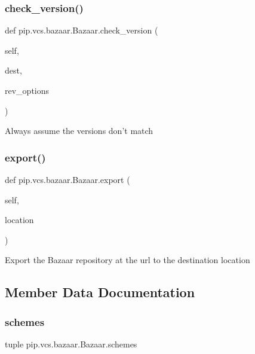 \subsubsection{\texorpdfstring{check\+\_\+version()}{check\_version()}}
{\footnotesize\ttfamily def pip.\+vcs.\+bazaar.\+Bazaar.\+check\+\_\+version (\begin{DoxyParamCaption}\item[{}]{self,  }\item[{}]{dest,  }\item[{}]{rev\+\_\+options }\end{DoxyParamCaption})}

\begin{DoxyVerb}Always assume the versions don't match\end{DoxyVerb}
 \mbox{\label{classpip_1_1vcs_1_1bazaar_1_1_bazaar_ada58f106fcf29da984e45a3e4e4d9057}} 
\subsubsection{\texorpdfstring{export()}{export()}}
{\footnotesize\ttfamily def pip.\+vcs.\+bazaar.\+Bazaar.\+export (\begin{DoxyParamCaption}\item[{}]{self,  }\item[{}]{location }\end{DoxyParamCaption})}

\begin{DoxyVerb}Export the Bazaar repository at the url to the destination location
\end{DoxyVerb}
 

\subsection{Member Data Documentation}
\mbox{\label{classpip_1_1vcs_1_1bazaar_1_1_bazaar_ad9faf6a30b6d7bcdb2e83c13bdee3324}} 
\subsubsection{\texorpdfstring{schemes}{schemes}}
{\footnotesize\ttfamily tuple pip.\+vcs.\+bazaar.\+Bazaar.\+schemes\hspace{0.3cm}{\ttfamily [static]}}

